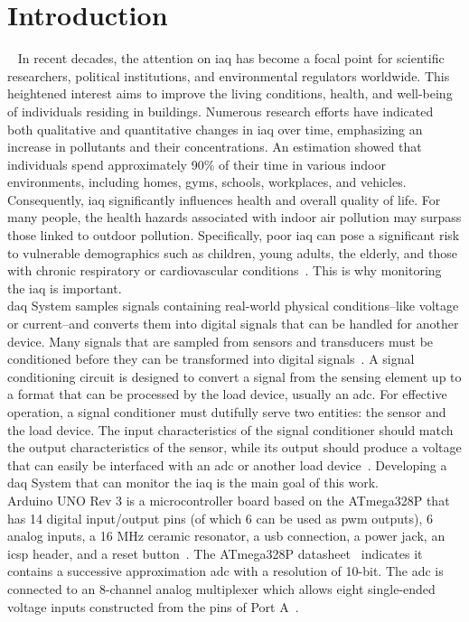 \section{Introduction}
~\label{sec:introduction}
\hspace{8pt}
In recent decades, the attention on \acrfull{iaq} has become a focal point for scientific researchers, political institutions, and environmental regulators worldwide. This heightened interest aims to improve the living conditions, health, and well-being of individuals residing in buildings. Numerous research efforts have indicated both qualitative and quantitative changes in \acrshort{iaq} over time, emphasizing an increase in pollutants and their concentrations. An estimation showed that individuals spend approximately 90\% of their time in various indoor environments, including homes, gyms, schools, workplaces, and vehicles. Consequently, \acrshort{iaq} significantly influences health and overall quality of life. For many people, the health hazards associated with indoor air pollution may surpass those linked to outdoor pollution. Specifically, poor \acrshort{iaq} can pose a significant risk to vulnerable demographics such as children, young adults, the elderly, and those with chronic respiratory or cardiovascular conditions~\cite{cincinelli_2017}. This is why monitoring the \acrshort{iaq} is important. \\

\acrfull{daq} System samples signals containing real-world physical conditions--like voltage or current--and converts them into digital signals that can be handled for another device. Many signals that are sampled from sensors and transducers must be conditioned before they can be transformed into digital signals~\cite{di_paolo_2013}. A signal conditioning circuit is designed to convert a signal from the sensing element up to a format that can be processed by the load device, usually an \acrfull{adc}. For effective operation, a signal conditioner must dutifully serve two entities: the sensor and the load device. The input characteristics of the signal conditioner should match the output characteristics of the sensor, while its output should produce a voltage that can easily be interfaced with an \acrshort{adc} or another load device~\cite{fraden_2016}. Developing a \acrshort{daq} System that can monitor the \acrshort{iaq} is the main goal of this work. \\

Arduino UNO Rev 3 is a microcontroller board based on the ATmega328P that has 14 digital input/output pins (of which 6 can be used as \acrfull{pwm} outputs), 6 analog inputs, a 16 MHz ceramic resonator, a \acrfull{usb} connection, a power jack, an \acrfull{icsp} header, and a reset button~\cite{arduino_2024}. The ATmega328P datasheet~\cite{atmega328p} indicates it contains a successive approximation \acrshort{adc} with a resolution of 10-bit. The \acrshort{adc} is connected to an 8-channel analog multiplexer which allows eight single-ended voltage inputs constructed from the pins of Port A~\cite{atmega328p}.
